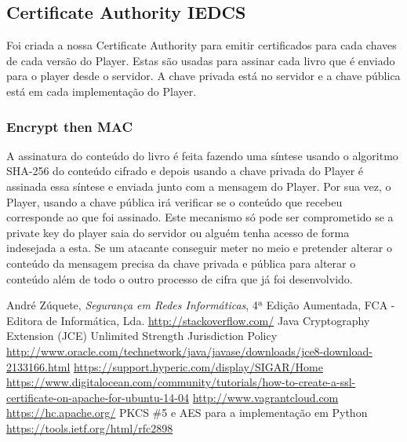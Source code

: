 \documentclass[pdftex,12pt,a4paper]{report}
\begin{document}
\subsection{Certificate Authority IEDCS}
Foi criada a nossa Certificate Authority para emitir certificados para cada chaves de cada versão do Player. Estas são usadas para assinar cada livro que é enviado para o player desde o servidor. A chave privada está no servidor e a chave pública está em cada implementação do Player.

\subsubsection{Encrypt then MAC}

A assinatura do conteúdo do livro é feita fazendo uma síntese usando o algoritmo SHA-256 do conteúdo cifrado e depois usando a chave privada do Player é assinada essa síntese e enviada junto com a mensagem do Player. Por sua vez, o Player, usando a chave pública irá verificar se o conteúdo que recebeu corresponde ao que foi assinado.
Este mecanismo só pode ser comprometido se a private key do player saia do servidor ou alguém tenha acesso de forma indesejada a esta. Se um atacante conseguir meter no meio e pretender alterar o conteúdo da mensagem precisa da chave privada e pública para alterar o conteúdo além de todo o outro processo de cifra que já foi desenvolvido. 

\renewcommand{\bibname}{Referências}

\begin{thebibliography}{} 
	 André Zúquete, \textit{Segurança em Redes Informáticas}, 4ª Edição Aumentada, FCA - Editora de Informática, Lda.
	 \url{http://stackoverflow.com/}
	 Java Cryptography Extension (JCE) Unlimited Strength Jurisdiction Policy \url{http://www.oracle.com/technetwork/java/javase/downloads/jce8-download-2133166.html}
	 \url{https://support.hyperic.com/display/SIGAR/Home}
	 \url{https://www.digitalocean.com/community/tutorials/how-to-create-a-ssl-certificate-on-apache-for-ubuntu-14-04}
	 \url{http://www.vagrantcloud.com}
	 \url{https://hc.apache.org/}
	 PKCS {\#}5 e AES para a implementação em Python \url{https://tools.ietf.org/html/rfc2898}
\end{thebibliography}
\end{document}
